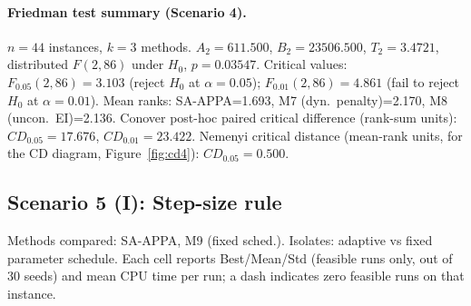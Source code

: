 \paragraph{Friedman test summary (Scenario 4).}
$n=44$ instances, $k=3$ methods. $A_2=611.500$, $B_2=23506.500$, $T_2=3.4721$, distributed $F(2,86)$ under $H_0$, $p=0.03547$. Critical values: $F_{0.05}(2,86)=3.103$ (reject $H_0$ at $\alpha=0.05$); $F_{0.01}(2,86)=4.861$ (fail to reject $H_0$ at $\alpha=0.01$). Mean ranks: SA-APPA=1.693, M7 (dyn.\ penalty)=2.170, M8 (uncon.\ EI)=2.136. Conover post-hoc paired critical difference (rank-sum units): $CD_{0.05}=17.676$, $CD_{0.01}=23.422$. Nemenyi critical distance (mean-rank units, for the CD diagram, Figure~\ref{fig:cd4}): $CD_{0.05}=0.500$.

\subsection{Scenario 5 (I): Step-size rule}
\label{app:scenario5}
Methods compared: SA-APPA, M9 (fixed sched.). Isolates: adaptive vs fixed parameter schedule. Each cell reports Best/Mean/Std (feasible runs only, out of 30 seeds) and mean CPU time per run; a dash indicates zero feasible runs on that instance.

